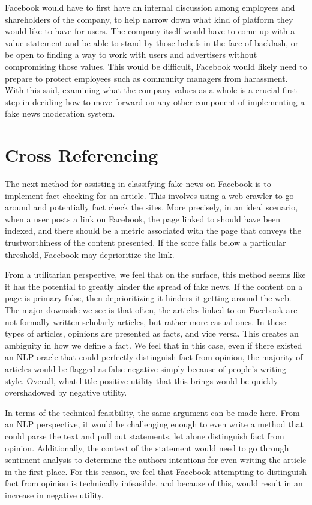 \documentclass[12pt]{article}
\begin{document}
Facebook would have to first have an internal discussion among employees and shareholders of the company, to help narrow down what kind of platform they would like to have for users. The company itself would have to come up with a value statement and be able to stand by those beliefs in the face of backlash, or be open to finding a way to work with users and advertisers without compromising those values. This would be difficult, Facebook would likely need to prepare to protect employees such as community managers from harassment. With this said, examining what the company values as a whole is a crucial first step in deciding how to move forward on any other component of implementing a fake news moderation system.

\section{Cross Referencing}
The next method for assisting in classifying fake news on Facebook is to implement fact checking for an article. This involves using a web crawler to go around and potentially fact check the sites. More precisely, in an ideal scenario, when a user posts a link on Facebook, the page linked to should have been indexed, and there should be a metric associated with the page that conveys the trustworthiness of the content presented. If the score falls below a particular threshold, Facebook may deprioritize the link.  

From a utilitarian perspective, we feel that on the surface, this method seems like it has the potential to greatly hinder the spread of fake news. If the content on a page is primary false, then deprioritizing it hinders it getting around the web. The major downside we see is that often, the articles linked to on Facebook are not formally written scholarly articles, but rather more casual ones. In these types of articles, opinions are presented as facts, and vice versa. This creates an ambiguity in how we define a fact. We feel that in this case, even if there existed an NLP oracle that could perfectly distinguish fact from opinion, the majority of articles would be flagged as false negative simply because of people's writing style. Overall, what little positive utility that this brings would be quickly overshadowed by negative utility.

In terms of the technical feasibility, the same argument can be made here. From an NLP perspective, it would be challenging enough to even write a method that could parse the text and pull out statements, let alone distinguish fact from opinion. Additionally, the context of the statement would need to go through sentiment analysis to determine the authors intentions for even writing the article in the first place. For this reason, we feel that Facebook attempting to distinguish fact from opinion is technically infeasible, and because of this, would result in an increase in negative utility.
\end{document}
